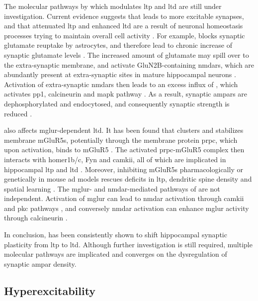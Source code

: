 The molecular pathways by which \abeta{} modulates \gls{ltp} and \gls{ltd} are still under investigation. Current evidence suggests that \abeta{} leads to more excitable synapses, and that attenuated \gls{ltp} and enhanced \gls{ltd} are a result of neuronal homeostasis processes trying to maintain overall cell activity \citep{guntupalli16, jang16}. For example, \abeta{} blocks synaptic glutamate reuptake by astrocytes, and therefore lead to chronic increase of synaptic glutamate levels \citep{matos08, li09}. The increased amount of glutamate may spill over to the extra-synaptic membrane, and activate GluN2B-containing \glspl{nmdar}, which are abundantly present at extra-synaptic sites in mature hippocampal neurons \citep{citri08, li11, shipton14}. Activation of extra-synaptic \glspl{nmdar} then leads to an excess influx of , which activates \gls{pp1}, calcineurin and \gls{mapk} pathway \citep{hsieh06, shankar07, zhao10}. As a result, synaptic \glspl{ampar} are dephosphorylated and endocytosed, and consequently synaptic strength is reduced \citep{hsieh06, liu10, minanomolina11}. 

\abeta{} also affects \gls{mglur}-dependent \gls{ltd}. It has been found that \abeta{} clusters and stabilizes membrane mGluR5s, potentially through the membrane protein \gls{prpc}, which upon \abeta{} activation, binds to mGluR5 \citep{renner10, um13}. The activated \gls{prpc}-mGluR5 complex then interacts with homer1b/c, Fyn and \gls{camkii}, all of which are implicated in hippocampal \gls{ltp} and \gls{ltd} \citep{raka15, haas16}. Moreover, inhibiting mGluR5s pharmacologically or genetically in mouse \gls{ad} models rescues deficits in \gls{ltp}, dendritic spine density and spatial learning \citep{rammes11, hu14, um13, hamilton14}. The \gls{mglur}- and \gls{nmdar}-mediated pathways of \abeta{} are not independent. Activation of \gls{mglur} can lead to \gls{nmdar} activation through \gls{camkii} and \gls{pkc} pathways \citep{chen11, jin15}, and conversely \gls{nmdar} activation can enhance \gls{mglur} activity through calcineurin \citep{alagarsamy99, alagarsamy05}. 

In conclusion, \abeta{} has been consistently shown to shift hippocampal synaptic plasticity from \gls{ltp} to \gls{ltd}. Although further investigation is still required, multiple molecular pathways are implicated and converges on the dysregulation of synaptic \gls{ampar} density. 

\subsection{Hyperexcitability}

